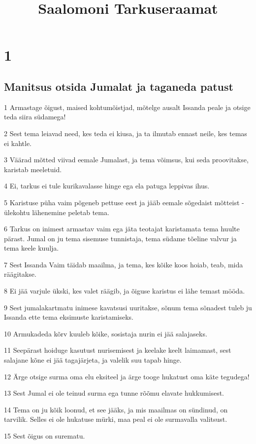

\title{Saalomoni Tarkuseraamat}

\chapter{1}

\section*{Manitsus otsida Jumalat ja taganeda patust}

\par 1 Armastage õigust, maised kohtumõistjad, mõtelge ausalt Issanda peale ja otsige teda siira südamega!
\par 2 Sest tema leiavad need, kes teda ei kiusa, ja ta ilmutab ennast neile, kes temas ei kahtle.
\par 3 Väärad mõtted viivad eemale Jumalast, ja tema võimsus, kui seda proovitakse, karistab meeletuid.
\par 4 Ei, tarkus ei tule kurikavalasse hinge ega ela patuga leppivas ihus.
\par 5 Karistuse püha vaim põgeneb pettuse eest ja jääb eemale sõgedaist mõtteist - ülekohtu lähenemine peletab tema.
\par 6 Tarkus on inimest armastav vaim ega jäta teotajat karistamata tema huulte pärast. Jumal on ju tema sisemuse tunnistaja, tema südame tõeline valvur ja tema keele kuulja.
\par 7 Sest Issanda Vaim täidab maailma, ja tema, kes kõike koos hoiab, teab, mida räägitakse.
\par 8 Ei jää varjule ükski, kes valet räägib, ja õiguse karistus ei lähe temast mööda.
\par 9 Sest jumalakartmatu inimese kavatsusi uuritakse, sõnum tema sõnadest tuleb ju Issanda ette tema eksimuste karistamiseks.
\par 10 Armukadeda kõrv kuuleb kõike, sosistaja nurin ei jää salajaseks.
\par 11 Seepärast hoiduge kasutust nurisemisest ja keelake keelt laimamast, sest salajane kõne ei jää tagajärjeta, ja valelik suu tapab hinge.
\par 12 Ärge otsige surma oma elu eksiteel ja ärge tooge hukatust oma käte tegudega!
\par 13 Sest Jumal ei ole teinud surma ega tunne rõõmu elavate hukkumisest.
\par 14 Tema on ju kõik loonud, et see jääks, ja mis maailmas on sündinud, on tarvilik. Selles ei ole hukatuse mürki, maa peal ei ole surmavalla valitsust.
\par 15 Sest õigus on surematu.

